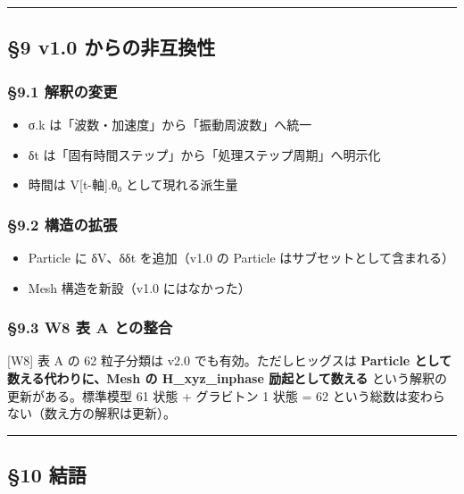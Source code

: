 \documentclass[a4paper,11pt]{ltjsarticle}
\providecommand{\tightlist}{\setlength{\itemsep}{0pt}\setlength{\parskip}{0pt}}
\begin{document}
\begin{center}\rule{0.5\linewidth}{0.5pt}\end{center}

\subsection{§9 v1.0
からの非互換性}\label{v1.0-ux304bux3089ux306eux975eux4e92ux63dbux6027}

\subsubsection{§9.1 解釈の変更}\label{ux89e3ux91c8ux306eux5909ux66f4}

\begin{itemize}
\tightlist
\item
  σ.k は「波数・加速度」から「振動周波数」へ統一
\item
  δt は「固有時間ステップ」から「処理ステップ周期」へ明示化
\item
  時間は V{[}t-軸{]}.θ₀ として現れる派生量
\end{itemize}

\subsubsection{§9.2 構造の拡張}\label{ux69cbux9020ux306eux62e1ux5f35}

\begin{itemize}
\tightlist
\item
  Particle に δV、δδt を追加（v1.0 の Particle
  はサブセットとして含まれる）
\item
  Mesh 構造を新設（v1.0 にはなかった）
\end{itemize}

\subsubsection{§9.3 W8 表 A
との整合}\label{w8-ux8868-a-ux3068ux306eux6574ux5408}

{[}W8{]} 表 A の 62 粒子分類は v2.0 でも有効。ただしヒッグスは
\textbf{Particle として数える代わりに、Mesh の H\_xyz\_inphase
励起として数える} という解釈の更新がある。標準模型 61 状態 + グラビトン
1 状態 = 62 という総数は変わらない（数え方の解釈は更新）。

\begin{center}\rule{0.5\linewidth}{0.5pt}\end{center}

\subsection{§10 結語}\label{ux7d50ux8a9e}
\end{document}
